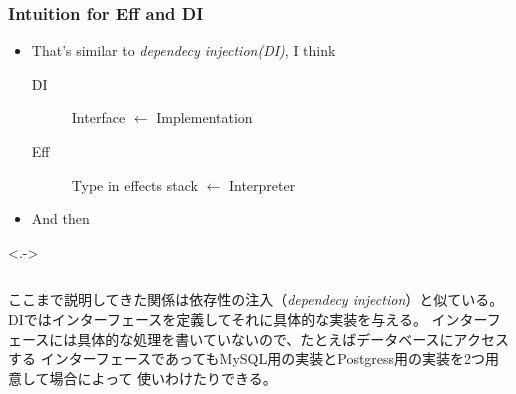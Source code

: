 \begin{frame}
  \frametitle{Intuition for Eff and DI}

  \begin{itemize}
    \item<+-> That's similar to \emph{dependecy injection(DI)}, I think
    \begin{description}
      \item[DI] Interface $\leftarrow$ Implementation
      \item[Eff] Type in effects stack $\leftarrow$ Interpreter
    \end{description}

    \item<+-> And then
  \end{itemize}

  \uncover<.->{
    \begin{columns}
      \begin{column}{0.35\textwidth}
      \end{column}
      \begin{column}{0.65\textwidth}
        \begin{center}
        \end{center}
      \end{column}
    \end{columns}
  }

  \begin{notes}
    \item ここまで説明してきた関係は依存性の注入（\emph{dependecy injection}）と似ている。
    DIではインターフェースを定義してそれに具体的な実装を与える。
    インターフェースには具体的な処理を書いていないので、たとえばデータベースにアクセスする
    インターフェースであってもMySQL用の実装とPostgress用の実装を2つ用意して場合によって
    使いわけたりできる。


\end{notes}
\end{frame}
